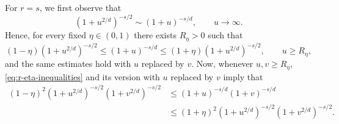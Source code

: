 \documentclass[a4paper,12pt]{article}
\let\originalleft\left
\let\originalright\right
\renewcommand{\left}{\mathopen{}\mathclose\bgroup\originalleft}
\renewcommand{\right}{\aftergroup\egroup\originalright}
\newcommand{\symbolnotsobw}{\symbolnot_{\mathcal{W}}}
\newcommand{\symbolnot}{\sigma}
\begin{document}
\fi 
\fi 
For $r=s$, we first observe that
\[
(1+u^{2/d})^{-s/2}\sim(1+u)^{-s/d},
\qquad u\to\infty .
\]
Hence, for every fixed $\eta\in(0,1)$ there exists $R_\eta>0$ such that
\begin{equation}\label{eq:r-eta-inequalities}
(1-\eta)(1+u^{2/d})^{-s/2}
\le
(1+u)^{-s/d}
\le
(1+\eta)(1+u^{2/d})^{-s/2},
\qquad u\ge R_\eta ,
\end{equation}
and the same estimates hold with $u$ replaced by $v$. Now, whenever
$u,v\ge R_\eta$, \eqref{eq:r-eta-inequalities} and its
version with $u$ replaced by $v$ imply that
\begin{align*}
    (1-\eta)^2 (1+u^{2/d})^{-s/2}(1+v^{2/d})^{-s/2}
&\le
(1+u)^{-s/d}(1+v)^{-s/d} \\
&\le
(1+\eta)^2 (1+u^{2/d})^{-s/2}(1+v^{2/d})^{-s/2}.
\end{align*}
\end{document}
